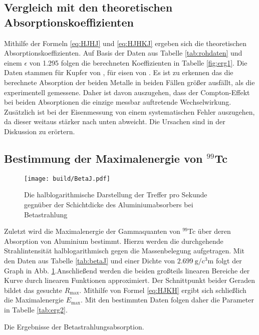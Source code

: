 \subsection{Vergleich mit den theoretischen Absorptionskoeffizienten}
Mithilfe der Formeln \ref{eq:HJHJ} und \ref{eq:HJHKJ} ergeben sich die theoretischen
Absorptionskoeffizienten. Auf Basis der Daten aus Tabelle \ref{tab:rohdaten} und einem
 $\epsilon$ von 1.295 \cite{V704} folgen die berechneten Koeffizienten in Tabelle \ref{fig:erg1}.
 Die Daten stammen für Kupfer von \cite{Kupfer}, für eisen von \cite{Eisen}.
Es ist zu erkennen das die berechnete Absorption der beiden Metalle in beiden
Fällen größer ausfällt, als die experimentell gemessene. Daher ist davon auszugehen,
dass der Compton-Effekt bei beiden Absorptionen die einzige messbar auftretende Wechselwirkung.
Zusätzlich ist bei der Eisenmessung von einem systematischen Fehler auszugehen,
da dieser weitaus stärker nach unten abweicht. Die Ursachen sind in der Diskussion zu erörtern.
\subsection{Bestimmung der Maximalenergie von $^{99}$Tc }


\begin{figure}
 \centering
 \caption{Die halblogarithmische Darstellung der Treffer pro Sekunde gegnüber der Schichtdicke des Aluminiumabsorbers bei Betastrahlung}
 \texttt{[image: build/BetaJ.pdf]}
 \label{fig:betaj}
\end{figure}

Zuletzt wird die Maximalenergie der Gammaquanten von $^{99}$Tc über deren Absorption von Aluminium bestimmt. Hierzu werden
die durchgehende Strahlintensität halblogarithmisch gegen die Massenbelegung aufgetragen.
Mit den Daten aus Tabelle \ref{tab:betaJ} und einer Dichte von $\SI{2.699}{\gram\per\cubic\centi\meter}$ folgt der Graph in Abb. \ref{fig:betaj}.Anschließend werden
die beiden großteils linearen Bereiche der Kurve durch linearen Funktionen approximiert. Der
 Schnittpunkt beider Geraden bildet das gesuchte $R_\text{max}$. Mithilfe von Formel \ref{eq:HJKH}
 ergibt sich schließlich die Maximalenergie $E_\text{max}$. Mit den bestimmten Daten folgen daher die Parameter in Tabelle \ref{tab:erg2}.
\begin{table}
 \centering
 \caption{Die Ergebnisse der Betastrahlungsabsorption.}
 
 \label{tab:erg2}
\end{table}
